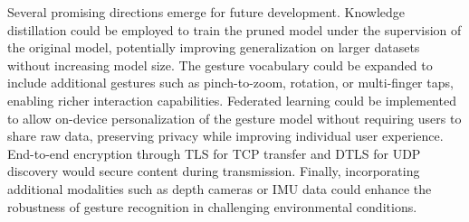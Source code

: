 Several promising directions emerge for future development. Knowledge distillation could be employed to train the pruned model under the supervision of the original model, potentially improving generalization on larger datasets without increasing model size. The gesture vocabulary could be expanded to include additional gestures such as pinch-to-zoom, rotation, or multi-finger taps, enabling richer interaction capabilities. Federated learning could be implemented to allow on-device personalization of the gesture model without requiring users to share raw data, preserving privacy while improving individual user experience. End-to-end encryption through TLS for TCP transfer and DTLS for UDP discovery would secure content during transmission. Finally, incorporating additional modalities such as depth cameras or IMU data could enhance the robustness of gesture recognition in challenging environmental conditions.
